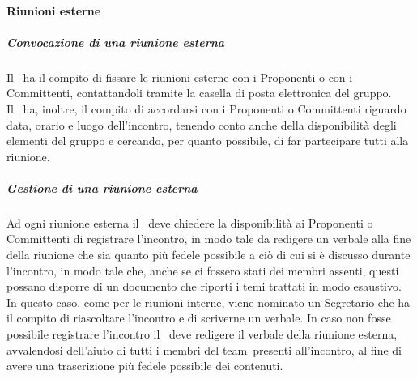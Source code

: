 \documentclass[../NormeProgetto.tex]{subfiles}
\begin{document}
			\paragraph{Riunioni esterne}
			\subparagraph{Convocazione di una riunione esterna}
			Il \responsabilediprogetto\ ha il compito di fissare le riunioni esterne con i Proponenti o con i Committenti, contattandoli tramite la casella di posta elettronica del gruppo.\\ Il \responsabilediprogetto\ ha, inoltre, il compito di accordarsi con i Proponenti o Committenti riguardo data, orario e luogo dell'incontro, tenendo conto anche della disponibilità degli elementi del gruppo e cercando, per quanto possibile, di far partecipare tutti alla riunione.
			\subparagraph{Gestione di una riunione esterna}
			Ad ogni riunione esterna il \responsabilediprogetto\ deve chiedere la disponibilità ai Proponenti o Committenti di registrare l'incontro, in modo tale da redigere un verbale alla fine della riunione che sia quanto più fedele possibile a ciò di cui si è discusso durante l'incontro, in modo tale che, anche se ci fossero stati dei membri assenti, questi possano disporre di un documento che riporti i temi trattati in modo esaustivo. In questo caso, come per le riunioni interne, viene nominato un Segretario che ha il compito di riascoltare l'incontro e di scriverne un verbale. In caso non fosse possibile registrare l'incontro il \responsabilediprogetto\ deve redigere il verbale della riunione esterna, avvalendosi dell'aiuto di tutti i membri del team\g\ presenti all'incontro, al fine di avere una trascrizione più fedele possibile dei contenuti.
\end{document}
